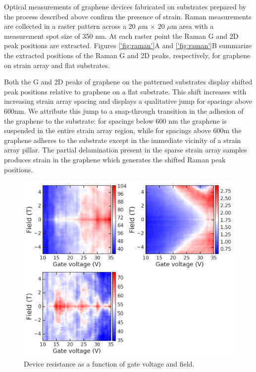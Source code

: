 \documentclass[%
 aip,
 apl,%
 amsmath,amssymb,
 reprint,%
]{revtex4-1}
\begin{document}
Optical measurements of graphene devices fabricated on substrates prepared by the process described above
confirm the presence of strain. Raman measurements are collected in a raster pattern across a 
20 $\mu$m  $\times$ 20 $\mu$m area with a measurement spot size of 350 nm. 
At each raster point the Raman G and 2D peak positions are extracted\cite{ferrari2006raman}. 
Figures \ref{'fig:raman'}A and \ref{'fig:raman'}B summarize the extracted positions 
of the Raman G and 2D peaks, respectively, for graphene on strain array and flat substrates.  

Both the G and 2D peaks of graphene on the patterned 
substrates display shifted peak positions relative to graphene on a flat substrate. 
This shift increases with increasing strain array spacing and displays a qualitative jump
for spacings above 600nm. We attribute this jump to a 
snap-through transition\cite{gill2015mechanical, scharfenberg2012observation}
in the adhesion of the graphene to the substrate: for spacings below 600 nm the graphene is suspended
in the entire strain array region, while for spacings above 600m the graphene adheres to the substrate
except in the immediate vicinity of a strain array pillar. The partial delamination
present in the sparse strain array samples
produces strain in the graphene which generates the shifted Raman peak positions.

\begin{figure}
\centering
\includegraphics[width=1.8\columnwidth]{Figure4}
\caption{Device resistance as a function of gate voltage and field.}
\label{'fig:transport'}
\end{figure}
\end{document}
